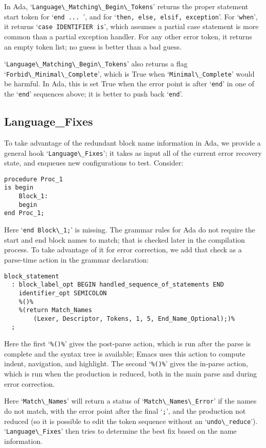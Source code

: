 \documentclass{article}
\newcommand{\code}[1]{`\lstinline|#1|'}
\begin{document}
In Ada, \code{Language\_Matching\_Begin\_Tokens} returns the proper
statement start token for \code{end ... }, and for
\code{then, else, elsif, exception}. For \code{when}, it returns
\code{case IDENTIFIER is}, which assumes a partial case statement is
more common than a partial exception handler. For any other error
token, it returns an empty token list; no guess is better than a bad
guess.

\code{Language\_Matching\_Begin\_Tokens} also returns a flag\\
\code{Forbid\_Minimal\_Complete}, which is True when
\code{Minimal\_Complete} would be harmful. In Ada, this is set True
when the error point is after \code{end} in one of the \code{end}
sequences above; it is better to push back \code{end}.

\subsection{Language\_Fixes}
To take advantage of the redundant block name information in Ada, we
provide a general hook \code{Language\_Fixes}; it takes as input all of
the current error recovery state, and enqueues new configurations to
test.
Consider:
\begin{lstlisting}
procedure Proc_1
is begin
    Block_1:
    begin
end Proc_1;
\end{lstlisting}
Here \code{end Block\_1;} is missing. The grammar rules for Ada do not
require the start and end block names to match; that is checked later
in the compilation process. To take advantage of it for error
correction, we add that check as a parse-time action in the grammar
declaration:
\begin{verbatim}
block_statement
  : block_label_opt BEGIN handled_sequence_of_statements END
    identifier_opt SEMICOLON
    %()%
    %(return Match_Names
        (Lexer, Descriptor, Tokens, 1, 5, End_Name_Optional);)%
  ;
\end{verbatim}
Here the first `\verb|%()%|' gives the post-parse action, which is run
after the parse is complete and the syntax tree is available; Emacs
uses this action to compute indent, navigation, and highlight. The
second `\verb|%()%|' gives the in-parse action, which is run when the
production is reduced, both in the main parse and during error
correction.

Here \code{Match\_Names} will return a status of
\code{Match\_Names\_Error} if the names do not match, with the error
point after the final \code{;}, and the production not reduced (so it
is possible to edit the token sequence without an
\code{undo\_reduce}). \code{Language\_Fixes} then tries to determine
the best fix based on the name information.
\end{document}
